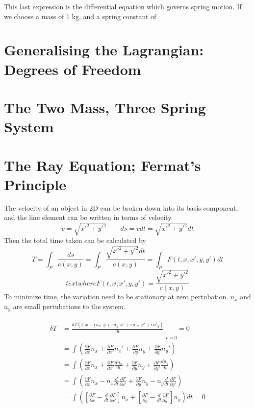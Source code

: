 \documentclass[%
 preprint,
 amsmath,amssymb,
 aps,
 pra,
 fleqn,
]{revtex4-2}
\begin{document}
This last expression is the differential equation which governs spring motion.  If we choose a mass of 1 kg, and a spring constant of

\section{Generalising the Lagrangian: Degrees of Freedom} %

\section{The Two Mass, Three Spring System} %

\section{The Ray Equation; Fermat's Principle} %
The velocity of an object in 2D can be broken down into its basis component, and the line element can be written in terms of velocity.
\[v = \sqrt{x'^2+y'^2}\qquad ds = vdt = \sqrt{x'^2+y'^2}dt\]
Then the total time taken can be calculated by
\[T = \int_P \frac{ds}{c(x,y)} = \int_P \frac{\sqrt{x'^2+y'^2}dt}{c(x,y)} = \int_PF(t,x,x',y,y')dt\]
\[text{ where }F(t,x,x',y,y') = \frac{\sqrt{x'^2+y'^2}}{c(x,y)}\]
To minimize time, the variation need to be stationary at zero pertubation. $n_x$ and $n_y$ are small pertubations to the system.
\begin{ceqn}
    \begin{align*}
        \delta T &= \left.\frac{d T(t,x+\epsilon n_x, y+\epsilon n_y,x'+\epsilon n'_x,y'+\epsilon n'_y)}{d\epsilon}\right|_{\epsilon=0} = 0\\
        &= \int \left(\frac{\partial F}{\partial x}n_x + \frac{\partial F}{\partial x'}n_x' + \frac{\partial F}{\partial y}n_y + \frac{\partial F}{\partial y'}n_y'\right)\\
        &= \int \left(\frac{\partial F}{\partial x}n_x + \frac{\partial F}{\partial x'}\frac{d n_x}{dt} + \frac{\partial F}{\partial y}n_y + \frac{\partial F}{\partial y'}\frac{d n_y}{dt}\right)\\
        &= \int \left(\frac{\partial F}{\partial x}n_x - n_x\frac{d}{dt}\frac{\partial F}{\partial x'} + \frac{\partial F}{\partial y}n_y - n_y\frac{d}{dt}\frac{\partial F}{\partial y'}\right)\\
        &= \int \left(\left[\frac{\partial F}{\partial x} - \frac{d}{dt}\frac{\partial F}{\partial x'}\right]n_x + \left[\frac{\partial F}{\partial y} - \frac{d}{dt}\frac{\partial F}{\partial y'}\right]n_y\right)dt = 0\\
    \end{align*}
\end{ceqn}
\end{document}
